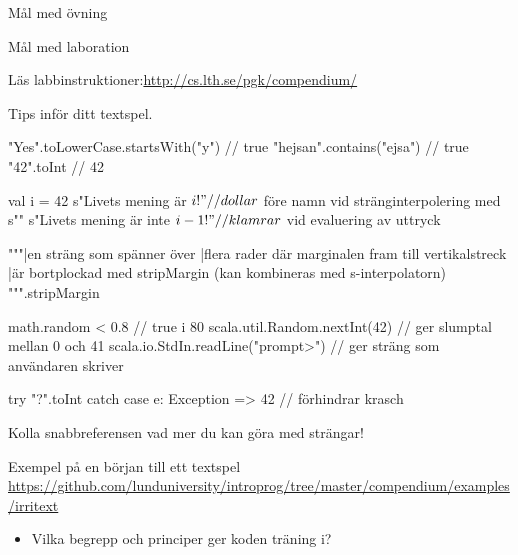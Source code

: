 

\ifkompendium\else
{}

\begin{Slide}{Mål med övning \ExeWeekTHREE}
\begin{itemize}\SlideFontSmall
  
\end{itemize}
\end{Slide}

\begin{Slide}{Mål med laboration \LabWeekTHREE}
\begin{itemize}
  
\end{itemize}
Läs labbinstruktioner:\url{http://cs.lth.se/pgk/compendium/}
\end{Slide}


\begin{Slide}{Tips inför ditt textspel.}
\begin{Code}
"Yes".toLowerCase.startsWith("y")    // true
"hejsan".contains("ejsa")            // true
"42".toInt                           // 42

val i = 42
s"Livets mening är $i!" // dollar $ före namn vid stränginterpolering med s""
s"Livets mening är inte ${i-1}!"  // klamrar ${} vid evaluering av uttryck

"""|en sträng som spänner över
   |flera rader där marginalen fram till vertikalstreck
   |är bortplockad med stripMargin (kan kombineras med s-interpolatorn)
""".stripMargin

math.random < 0.8                  // true i 80%
scala.util.Random.nextInt(42)      // ger slumptal mellan 0 och 41
scala.io.StdIn.readLine("prompt>") // ger sträng som användaren skriver

try { "?".toInt } catch { case e: Exception => 42 }  // förhindrar krasch

\end{Code}
Kolla snabbreferensen vad mer du kan göra med strängar!
\end{Slide}

\begin{Slide}{Exempel på en början till ett textspel}
  \url{https://github.com/lunduniversity/introprog/tree/master/compendium/examples/irritext}

\begin{itemize}
  \item Vilka begrepp och principer ger koden träning i?
\end{itemize}

\end{Slide}
\fi


